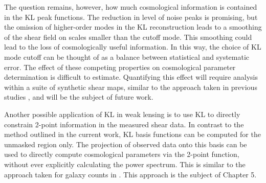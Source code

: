 The question remains, however, how much cosmological information is contained
in the KL peak functions.  The reduction in level of noise peaks is promising,
but the omission of higher-order modes in the KL reconstruction leads to 
a smoothing of the shear field on scales smaller than the cutoff mode.
This smoothing could lead to the loss of cosmologically useful information.
In this way, the choice of KL mode cutoff can be thought of as a balance 
between statistical and systematic error.
The effect of these competing properties on cosmological
parameter determination is difficult to estimate.  Quantifying this effect
will require analysis within a suite of synthetic shear maps, similar to the
approach taken in previous studies \citep[e.g.][]{Dietrich10,Kratochvil10}, 
and will be the subject of future work.

Another possible application of KL in weak lensing is to use KL to 
directly constrain 2-point information in the measured shear data.  
In contrast to the method outlined in the current work, 
KL basis functions can be computed for the unmasked region only.
The projection of observed data onto this basis can be used to 
directly compute cosmological parameters via the 2-point function, 
without ever explicitly calculating the power spectrum.  
This is similar to the approach taken for galaxy counts
in \citet{Vogeley96}.  This approach is the subject of Chapter 5.
